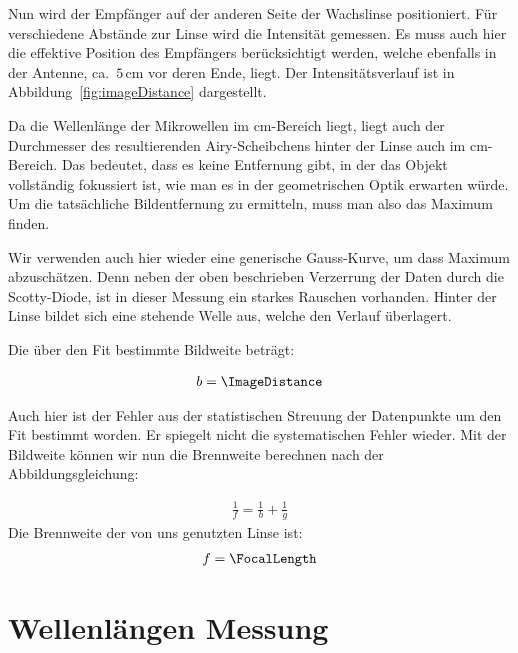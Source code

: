 \documentclass[a4paper,10pt,twocolumn]{article}
\begin{document}
    Nun wird der Empfänger auf der anderen Seite der Wachslinse positioniert.
    Für verschiedene Abstände zur Linse wird die Intensität gemessen.
    Es muss auch hier die effektive Position des Empfängers berücksichtigt werden, welche ebenfalls in der
    Antenne, ca.\ $5\,\mathrm{cm}$ vor deren Ende, liegt.
    Der Intensitätsverlauf ist in Abbildung~\ref{fig:imageDistance} dargestellt.
    
    Da die Wellenlänge der Mikrowellen im cm-Bereich liegt, liegt auch der Durchmesser 
    des resultierenden Airy-Scheibchens hinter der Linse auch im cm-Bereich.
    Das bedeutet, dass es keine Entfernung gibt, in der das Objekt vollständig fokussiert ist, wie man es in der
    geometrischen Optik erwarten würde. 
    Um die tatsächliche Bildentfernung zu ermitteln, muss man also das Maximum finden.
    
    Wir verwenden auch hier wieder eine generische Gauss-Kurve, um dass Maximum abzuschätzen.
    Denn neben der oben beschrieben Verzerrung der Daten durch die Scotty-Diode, ist in dieser Messung ein
    starkes Rauschen vorhanden.
    Hinter der Linse bildet sich eine stehende Welle aus, welche den Verlauf überlagert.
    
    
    Die über den Fit bestimmte Bildweite beträgt:
    
    \begin{align*}
        b = \ImageDistance
    \end{align*}

    Auch hier ist der Fehler aus der statistischen Streuung der Datenpunkte um den Fit bestimmt worden.
    Er spiegelt nicht die systematischen Fehler wieder.
    Mit der Bildweite können wir nun die Brennweite berechnen nach der Abbildungsgleichung:
    
    \begin{align}
        \label{eq:LensFormula}
        \frac{1}{f} = \frac{1}{b} + \frac{1}{g}
    \end{align}
    Die Brennweite der von uns genutzten Linse ist:
    \begin{align*}
        f = \FocalLength
    \end{align*}
    
    \section{Wellenlängen Messung}
\end{document}
